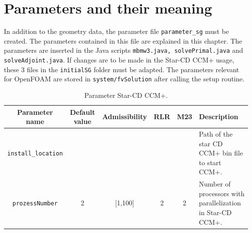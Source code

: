 \documentclass[oneside]{article}
\numberwithin{equation}{section}
\numberwithin{figure}{section}
\numberwithin{figure}{section}
\begin{document}
\section{Parameters and their meaning}
In addition to the geometry data, the parameter file \verb|parameter_sg| must be created. The parameters contained in this file are explained in this chapter. The parameters are inserted in the Java scripts \texttt{mbmw3.java, solvePrimal.java} and \texttt{solveAdjoint.java}. If changes are to be made in the Star-CD CCM+ usage, these 3 files in the \texttt{initialSG} folder must be adapted. The parameters relevant for OpenFOAM are stored in \texttt{system/fvSolution} after calling the setup routine.
\begin{table}[h]
    \centering
    \begin{tabular}{|c|c|c|c|c|p{7cm}|}
        \hline
        \cellcolor{light-gray}\textbf{Parameter name} & \cellcolor{light-gray}\textbf{Default value} & \cellcolor{light-gray}\textbf{Admissibility} & \cellcolor{light-gray}\textbf{RLR} & \cellcolor{light-gray}\textbf{M23} & \cellcolor{light-gray}\textbf{Description} \\
        \hline
        \verb|install_location| &  &  &  &  & Path of the star CD CCM+ bin file to start CCM+. \\
        \hline
        \texttt{prozessNumber} & 2 & [1,100] & 2 & 2 & Number of processors with parallelization in Star-CD CCM+.\\
        \hline
    \end{tabular}
    \caption{Parameter Star-CD CCM+.} \label{tab:parameter1}
\end{table}
\end{document}
